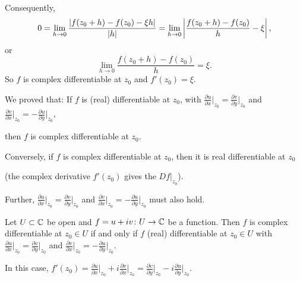 \documentclass[10pt,aspectratio=169]{beamer}
\begin{document}
\begin{frame}
Consequently,
\begin{equation*}
0 = \lim_{h \to 0} \frac{\lvert {f(z_0+h) - f(z_0) - \xi h} \rvert}{\lvert {h} \rvert} =
\lim_{h \to 0} \left\lvert {\frac{f(z_0+h) - f(z_0)}{h} - \xi} \right\rvert ,
\end{equation*}
\pause
or
\begin{equation*}
\lim_{h \to 0} \frac{f(z_0+h) - f(z_0)}{h} = \xi .
\end{equation*}
\pause
So $f$ is complex differentiable at $z_0$ and $f'(z_0) = \xi$.

\medskip
\pause

We proved that: If $f$ is (real) differentiable at $z_0$, with
$\frac{\partial u}{\partial x}\big|_{z_0} = \frac{\partial v}{\partial
y}\big|_{z_0}$ and $\frac{\partial v}{\partial x}\big|_{z_0} = -\frac{\partial
u}{\partial y}\big|_{z_0}$,

then $f$ is complex differentiable at $z_0$.

\end{frame}

\begin{frame}

Conversely,
if $f$ is complex differentiable at $z_0$, then it is real
differentiable at $z_0$

(the complex derivative $f'(z_0)$ gives the $Df|_{z_0}$).

\medskip
\pause

Further,
$\frac{\partial u}{\partial x}\big|_{z_0} = \frac{\partial v}{\partial
y}\big|_{z_0}$ and $\frac{\partial v}{\partial x}\big|_{z_0} = -\frac{\partial
u}{\partial y}\big|_{z_0}$
must also hold.

\pause

\begin{proposition}
Let $U \subset {\mathbb{C}}$ be open and $f = u+iv \colon U \to {\mathbb{C}}$ be a function.
Then
$f$ is complex differentiable at $z_0 \in U$
if and only if
$f$ (real) differentiable at $z_0 \in U$
with
$\frac{\partial u}{\partial x}\big|_{z_0} =
\frac{\partial v}{\partial y}\big|_{z_0}$
and
$\frac{\partial v}{\partial x}\big|_{z_0} =
-\frac{\partial u}{\partial y}\big|_{z_0}$.

\pause
In this case,
$f'(z_0) = 
\frac{\partial u}{\partial x}\big|_{z_0} + i \frac{\partial v}{\partial
x}\big|_{z_0} = \frac{\partial v}{\partial y}\big|_{z_0} - i \frac{\partial
u}{\partial y}\big|_{z_0}$.
\end{proposition}

\end{frame}
\end{document}
